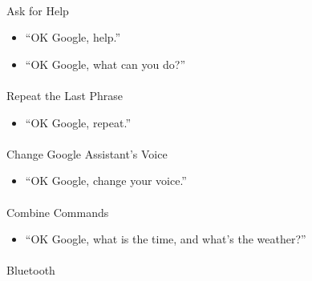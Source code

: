 \documentclass[
  a4paper,
]{article}
\makeatletter
\let\oldparagraph\paragraph
\renewcommand{\paragraph}{
    \@ifstar
      \xxxParagraphStar
      \xxxParagraphNoStar
  }
\newcommand{\xxxParagraphStar}[1]{\oldparagraph*{#1}\mbox{}}
\newcommand{\xxxParagraphNoStar}[1]{\oldparagraph{#1}\mbox{}}
\providecommand{\tightlist}{%
  \setlength{\itemsep}{0pt}\setlength{\parskip}{0pt}}\usepackage{longtable,booktabs,array}
\makeatother
\begin{document}
\paragraph{Ask for Help}\label{ask-for-help}

\begin{itemize}
\tightlist
\item
  ``OK Google, help.''
\item
  ``OK Google, what can you do?''
\end{itemize}

\paragraph{Repeat the Last Phrase}\label{repeat-the-last-phrase}

\begin{itemize}
\tightlist
\item
  ``OK Google, repeat.''
\end{itemize}

\paragraph{Change Google Assistant's
Voice}\label{change-google-assistants-voice}

\begin{itemize}
\tightlist
\item
  ``OK Google, change your voice.''
\end{itemize}

\paragraph{Combine Commands}\label{combine-commands}

\begin{itemize}
\tightlist
\item
  ``OK Google, what is the time, and what's the weather?''
\end{itemize}

\paragraph{Bluetooth}\label{bluetooth}
\end{document}
